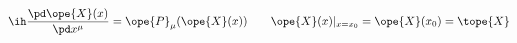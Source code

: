 \begin{equation}	\label{12.117}
\ih \frac{\pd\ope{X}(x)}{\pd x^\mu}
=
\ope{P}_{\mu} (\ope{X}(x))
\qquad
\ope{X}(x)|_{x=x_0}=\ope{X}(x_0) = \tope{X}
	\end{equation}

